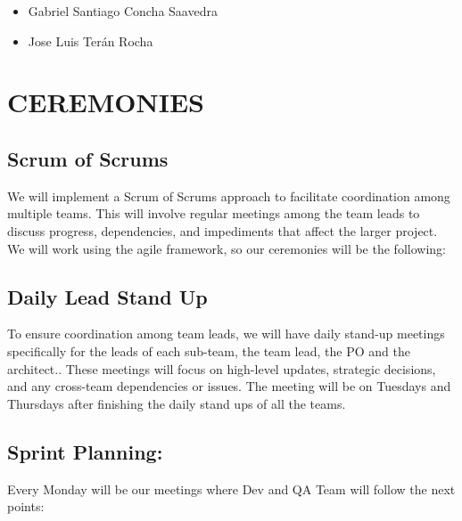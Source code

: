 \documentclass{article}
\providecommand{\tightlist}{
  \setlength{\itemsep}{0pt}\setlength{\parskip}{0pt}}
\begin{document}
\begin{itemize}
\tightlist
\item
  Gabriel Santiago Concha Saavedra
\item
  Jose Luis Terán Rocha
\end{itemize}

\newpage

\hypertarget{ceremonies}{
\section{CEREMONIES}\label{ceremonies}}

\hypertarget{scrumofscrums}{
\subsection{Scrum of Scrums}\label{scrumofscrums}}

We will implement a Scrum of Scrums approach to facilitate coordination
among multiple teams. This will involve regular meetings among the team
leads to discuss progress, dependencies, and impediments that affect the
larger project.\\
We will work using the agile framework, so our ceremonies will be the
following:~

\hypertarget{dailyleadstandup}{
\subsection{Daily Lead Stand Up}\label{dailyleadstandup}}

To ensure coordination among team leads, we will have daily stand-up
meetings specifically for the leads of each sub-team, the team lead, the
PO and the architect.. These meetings will focus on high-level updates,
strategic decisions, and any cross-team dependencies or issues. The
meeting will be on Tuesdays and Thursdays after finishing the daily
stand ups of all the teams.

\hypertarget{sprintplanning}{
\subsection{Sprint Planning:}\label{sprintplanning}}

Every Monday will be our meetings where Dev and QA Team will follow the
next points:
\end{document}
